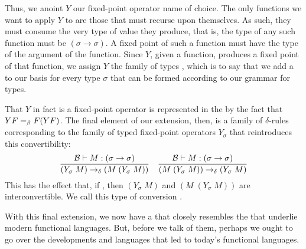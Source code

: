 Thus, we anoint $Y$ our fixed-point operator name of choice. The only functions we want to apply $Y$ to are those that must recurse upon themselves. As such, they must consume the very type of value they produce, that is, the type of any such function must be $(\sigma \to \sigma)$. A fixed point of such a function must have the type of the argument of the function.  Since $Y$, given a function, produces a fixed point of that function, we assign $Y$ the family of types , which is to say that we add a  to our basis \basis{} for every type $\sigma$ that can be formed according to our grammar for types.

That $Y$ in fact is a fixed-point operator is represented in the \lambdacalc by the fact that $Y F =_{\beta} F (Y F)$. The final element of our extension, then, is a family of $\delta$-rules corresponding to the family of typed fixed-point operators $Y_{\sigma}$ that reintroduces this convertibility:
\[
\frac{\basis \turnstile \stmt{M}{(\sigma \to \sigma)}}%
{(Y_{\sigma}\; M) \dred (M\; (Y_{\sigma}\; M))} 
\quad 
\frac{\basis \turnstile \stmt{M}{(\sigma \to \sigma)}}%
{(M\; (Y_{\sigma}\; M)) \dred (Y_{\sigma}\; M)}
\]
This has the effect that, if , then $(Y_{\sigma}\; M)$ and $(M\; (Y_{\sigma}\; M))$ are intercon\-vert\-i\-ble. We call this type of con\-ver\-sion .

With this final extension, we now have a \lambdacalc that closely resembles the \lambdacalcs that underlie modern functional languages. But, before we talk of them, perhaps we ought to go over the developments and languages that led to today's functional languages.
